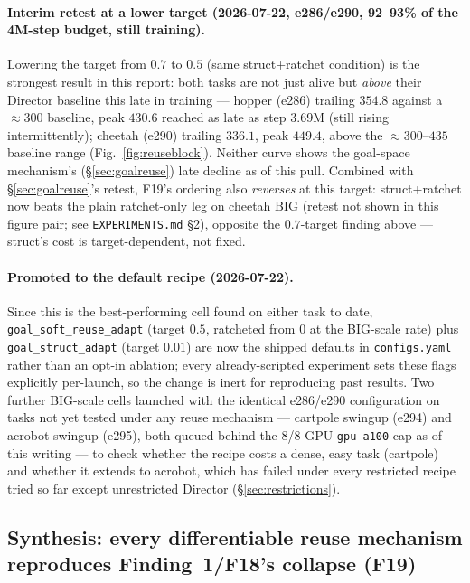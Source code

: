 \documentclass[10pt]{article}
\begin{document}
\paragraph{Interim retest at a lower target (2026-07-22, e286/e290, 92--93\%
of the 4M-step budget, still training).} Lowering the target from $0.7$ to
$0.5$ (same struct+ratchet condition) is the strongest result in this
report: both tasks are not just alive but \emph{above} their Director
baseline this late in training --- hopper (e286) trailing $354.8$ against a
$\approx\!300$ baseline, peak $430.6$ reached as late as step $3.69$M
(still rising intermittently); cheetah (e290) trailing $336.1$, peak
$449.4$, above the $\approx\!300$--$435$ baseline range
(Fig.~\ref{fig:reuseblock}). Neither curve shows the goal-space
mechanism's (\S\ref{sec:goalreuse}) late decline as of this pull. Combined
with \S\ref{sec:goalreuse}'s retest, F19's ordering also \emph{reverses} at
this target: struct+ratchet now beats the plain ratchet-only leg on cheetah
BIG (retest not shown in this figure pair; see \texttt{EXPERIMENTS.md}
\S2), opposite the $0.7$-target finding above --- struct's cost is
target-dependent, not fixed.

\paragraph{Promoted to the default recipe (2026-07-22).} Since this is the
best-performing cell found on either task to date, \texttt{goal\_soft\_reuse\_adapt}
(target $0.5$, ratcheted from $0$ at the BIG-scale rate) plus
\texttt{goal\_struct\_adapt} (target $0.01$) are now the shipped defaults in
\texttt{configs.yaml} rather than an opt-in ablation; every already-scripted
experiment sets these flags explicitly per-launch, so the change is inert
for reproducing past results. Two further BIG-scale cells launched with the
identical e286/e290 configuration on tasks not yet tested under any reuse
mechanism --- cartpole swingup (e294) and acrobot swingup (e295), both
queued behind the 8/8-GPU \texttt{gpu-a100} cap as of this writing --- to
check whether the recipe costs a dense, easy task (cartpole) and whether it
extends to acrobot, which has failed under every restricted recipe tried so
far except unrestricted Director (\S\ref{sec:restrictions}).

\subsection{Synthesis: every differentiable reuse mechanism reproduces
Finding~1/F18's collapse (F19)}
\label{sec:reusesynthesis}
\end{document}
